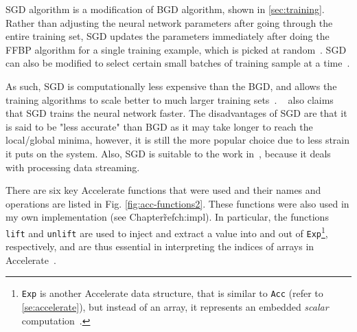 SGD algorithm is a modification of BGD algorithm, shown in \ref{sec:training}. Rather than adjusting the neural network parameters after going through the entire training set, SGD updates the parameters immediately after doing the FFBP algorithm for a single training example, which is picked at random~\cite{Ng12}. SGD can also be modified to select certain small batches of training sample at a time~\cite{LeC98}. 

As such, SGD is computationally less expensive than the BGD, and allows the training algorithms to scale better to much larger training sets~\cite{Ng12}. ~\cite{LeCBosDen89} also claims that SGD trains the neural network faster. The disadvantages of SGD are that it is said to be "less accurate" than BGD as it may take longer to reach the local/global minima, however, it is still the more popular choice due to less strain it puts on the system. Also, SGD is suitable to the work in~\cite{Eve16}, because it deals with processing data streaming.

There are six key Accelerate functions that were used and their names and operations are listed in Fig. \ref{fig:acc-functions2}. These functions were also used in my own implementation (see Chapter\~ref{ch:impl}). In particular, the functions \texttt{lift} and \texttt{unlift} are used to inject and extract a value into and out of \texttt{Exp}\footnote{\texttt{Exp} is another Accelerate data structure, that is similar to \texttt{Acc} (refer to \ref{se:accelerate}), but instead of an array, it represents an embedded \textit{scalar} computation~\cite{ChaKelLee11}.}, respectively, and are thus essential in interpreting the indices of arrays in Accelerate~\cite{Mar13}.

